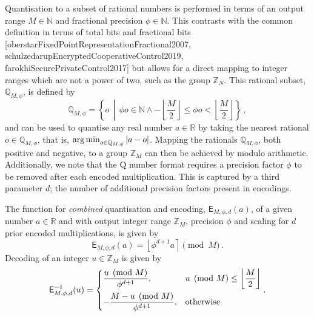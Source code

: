 Quantisation to a subset of rational numbers is performed in terms of an output range $M \in \mathbb{N}$ and fractional precision $\phi \in \mathbb{N}$. This contrasts with the common definition in terms of total bits and fractional bits [oberstarFixedPointRepresentationFractional2007, schulzedarupEncryptedCooperativeControl2019, farokhiSecurePrivateControl2017] but allows for a direct mapping to integer ranges which are not a power of two, such as the group $\mathbb{Z}_N$. This rational subset, $\mathbb{Q}_{M,\phi}$, is defined by
\begin{equation}
    \mathbb{Q}_{M,\phi} = \left\{o \,\middle|\, \phi o \in \mathbb{N} \wedge -\left\lfloor\frac{M}{2}\right\rfloor \leq \phi o < \left\lfloor\frac{M}{2}\right\rfloor \right\}\,,
\end{equation}
and can be used to quantise any real number $a \in \mathbb{R}$ by taking the nearest rational $o \in \mathbb{Q}_{M,\phi}$, that is, $\operatorname*{arg\,min}_{o\in\mathbb{Q}_{M,\phi}} |a-o|$. Mapping the rationals $\mathbb{Q}_{M,\phi}$, both positive and negative, to a group $\mathbb{Z}_M$ can then be achieved by modulo arithmetic. Additionally, we note that the Q number format requires a precision factor $\phi$ to be removed after each encoded multiplication. This is captured by a third parameter $d$; the number of additional precision factors present in encodings.

The function for \textit{combined} quantisation and encoding, $\mathsf{E}_{M,\phi,d}(a)$, of a given number $a \in \mathbb{R}$ and with output integer range $\mathbb{Z}_M$, precision $\phi$ and scaling for $d$ prior encoded multiplications, is given by
\begin{equation}\label{eq:prelims:encoding_encode}
    \mathsf{E}_{M,\phi,d}(a) = \left\lfloor \phi^{d+1} a \right\rceil \pmod{M}\,.
\end{equation}
Decoding of an integer $u \in \mathbb{Z}_M$ is given by
\begin{equation}\label{eq:prelims:encoding_decode}
    \mathsf{E}^{-1}_{M,\phi,d}(u)=
    \begin{dcases}
        \frac{u \pmod{M}}{\phi^{d+1}}, & u \pmod{M} \leq \left\lfloor\frac{M}{2}\right\rfloor \\
        -\frac{M - u \pmod{M}}{\phi^{d+1}}, & \text{otherwise}
    \end{dcases}.
\end{equation}

